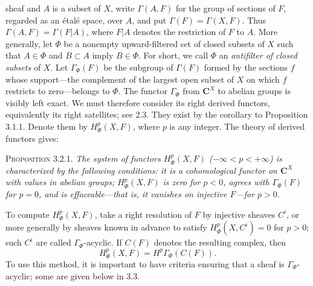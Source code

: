 
\noindent sheaf and $A$ is a subset of $X$, write $\Gamma(A,F)$ for the group
of sections of $F$, regarded as an étalé space, over $A$, and put
$\Gamma(F)=\Gamma(X,F)$. Thus $\Gamma(A,F)=\Gamma(F\vert A)$, where
$F\vert A$ denotes the restriction of $F$ to $A$. More generally, let $\Phi$
be a nonempty upward-filtered set of closed subsets of $X$ such that
$A\in\Phi$ and $B\subset A$ imply $B\in\Phi$. For short, we call $\Phi$ an
\textit{antifilter of closed subsets} of $X$. Let $\Gamma_\Phi(F)$ be the
subgroup of $\Gamma(F)$ formed by the sections $f$ whose support---the
complement of the largest open subset of $X$ on which $f$ restricts to
zero---belongs to $\Phi$.
The functor $\Gamma_\Phi$ from $\mathbf C^X$ to abelian groups is visibly left exact.
We must therefore consider its right derived functors, equivalently its right
satellites; see 2.3. They exist by the corollary to Proposition 3.1.1. Denote
them by $H^p_\Phi(X,F)$, where $p$ is any integer. The theory of derived
functors gives:

\indent\textsc{Proposition 3.2.1.} \textit{The system of functors
$H^p_\Phi(X,F)$ \textup{(}$-\infty<p<+\infty$\textup{)} is characterized by the following
conditions: it is a cohomological functor on $\mathbf C^X$ with values in abelian
groups; $H^p_\Phi(X,F)$ is zero for $p<0$, agrees with $\Gamma_\Phi(F)$ for
$p=0$, and is effaceable---that is, it vanishes on injective $F$---for
$p>0$.}

To compute $H^p_\Phi(X,F)$, take a right resolution of $F$ by injective
sheaves $C^i$, or more generally by sheaves known in advance to satisfy
$H^p_\Phi(X,C^i)=0$ for $p>0$; such $C^i$ are called
$\Gamma_\Phi$-acyclic. If $C(F)$ denotes the resulting complex, then
\[
H^p_\Phi(X,F)=H^p\Gamma_\Phi(C(F)).
\]
To use this method, it is important to have criteria ensuring that a sheaf is
$\Gamma_\Phi$-acyclic; some are given below in 3.3.

